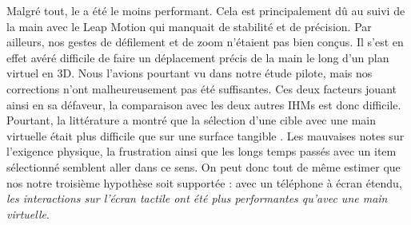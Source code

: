 Malgré tout, le  a été le moins performant. Cela est principalement dû au suivi de la main avec le Leap Motion qui manquait de stabilité et de précision. Par ailleurs, nos gestes de défilement et de zoom n'étaient pas bien conçus. Il s'est en effet avéré difficile de faire un déplacement précis de la main le long d'un plan virtuel en 3D. Nous l'avions pourtant vu dans notre étude pilote, mais nos corrections n'ont malheureusement pas été suffisantes. Ces deux facteurs jouant ainsi en sa défaveur, la comparaison avec les deux autres IHMs est donc difficile. Pourtant, la littérature a montré que la sélection d'une cible avec une main virtuelle était plus difficile que sur une surface tangible \citep{Chan2010, Jones2012, Argelaguet2013}. Les mauvaises notes sur l'exigence physique, la frustration ainsi que les longs temps passés avec un item sélectionné semblent aller dans ce sens. On peut donc tout de même estimer que nos notre troisième hypothèse soit supportée : avec un téléphone à écran étendu, \emph{les interactions sur l'écran tactile ont été plus performantes qu'avec une main virtuelle}.


